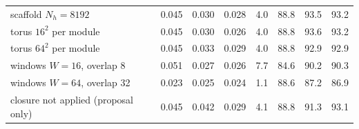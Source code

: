 \begin{table}[t]
\begin{tabular}{@{}l ccc c ccc@{}}
scaffold $N_h{=}8192$ & 0.045 & 0.030 & 0.028 & 4.0 & 88.8 & 93.5 & 93.2 \\
torus $16^2$ per module & 0.045 & 0.030 & 0.026 & 4.0 & 88.8 & 93.6 & 93.2 \\
torus $64^2$ per module & 0.045 & 0.033 & 0.029 & 4.0 & 88.8 & 92.9 & 92.9 \\
windows $W{=}16$, overlap 8 & 0.051 & 0.027 & 0.026 & 7.7 & 84.6 & 90.2 & 90.3 \\
windows $W{=}64$, overlap 32 & 0.023 & 0.025 & 0.024 & 1.1 & 88.6 & 87.2 & 86.9 \\
closure not applied (proposal only) & 0.045 & 0.042 & 0.029 & 4.1 & 88.8 & 91.3 & 93.1 \\
\bottomrule
\end{tabular}
\end{table}
